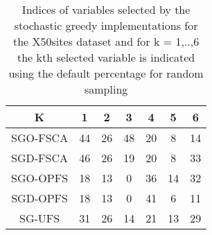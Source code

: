 \begin{table}
	\begin{center}
		\begin{tabular}{c c c c c c c}
			K & 1 & 2 & 3 & 4 & 5 & 6 \\
			\hline
			SGO-FSCA & 44 & 26 & 48 & 20 & 8 & 14 \\
			SGD-FSCA & 46 & 26 & 19 & 20 & 8 & 33 \\
			SGO-OPFS & 18 & 13 & 0 & 36 & 14 & 32 \\
			SGD-OPFS & 18 & 13 & 0 & 41 & 6 & 11 \\
			SG-UFS & 31 & 26 & 14 & 21 & 13 & 29 \\
		\end{tabular}
	\end{center}
	\caption{Indices of variables selected by the stochastic greedy implementations for the X50sites dataset and for k = 1,..,6 the kth selected variable is indicated using the default percentage for random sampling}
\end{table}
